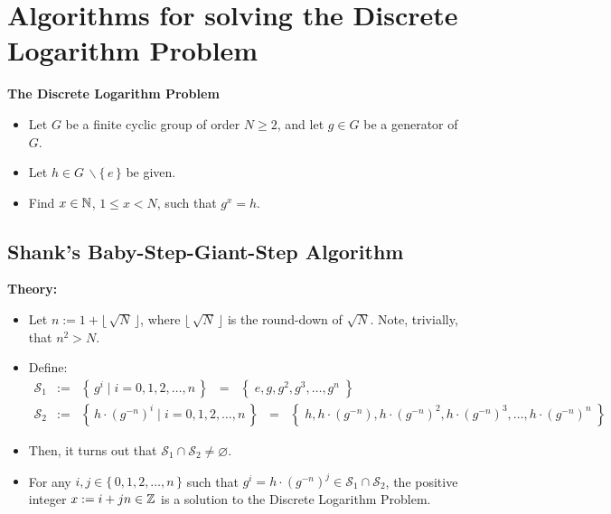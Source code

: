 
\section{Algorithms for solving the Discrete Logarithm Problem}
\setcounter{theorem}{0}
\setcounter{equation}{0}

\vskip 1.0cm
\begin{center}
\begin{minipage}{0.80\textwidth}
	\begin{center}\textbf{The Discrete Logarithm Problem}\end{center}
	\begin{itemize}
	\item	Let $G$ be a finite cyclic group of order $N \geq 2$, and let $g \in G$ be a generator of $G$.
	\item	Let $h \in G\,\backslash \{\,e\,\}$ be given.
	\item	Find $x \in \mathbb{N}$, $1 \leq x < N$, such that $g^{x} = h$.
	\end{itemize}
\end{minipage}
\end{center}
\vskip 1.0cm

\subsection{Shank's Baby-Step-Giant-Step Algorithm}

\noindent
\textbf{Theory:}
\begin{itemize}
\item	Let $n := 1 + \lfloor\,\sqrt{N}\,\rfloor$, where $\lfloor\,\sqrt{N}\,\rfloor$ is the round-down of $\sqrt{N}$.
		Note, trivially, that $n^{2} > N$.
\item	Define:
		\begin{eqnarray*}
		\mathcal{S}_{1} & := & \left\{\,g^{i}\;\vert\;i = 0,1,2,\ldots,n\,\right\}\;\;=\;\;\left\{\;e, g, g^{2}, g^{3}, \ldots, g^{n}\;\right\} \\
		\mathcal{S}_{2} & := & \left\{\,h\cdot(g^{-n})^{i}\;\vert\;i = 0,1,2,\ldots,n\,\right\}\;\;=\;\;\left\{\;h, h\cdot(g^{-n}), h\cdot(g^{-n})^{2}, h\cdot(g^{-n})^{3}, \ldots, h\cdot(g^{-n})^{n}\;\right\}
		\end{eqnarray*}
\item	Then, it turns out that $\mathcal{S}_{1}\cap\mathcal{S}_{2} \neq \varnothing$.
\item	For any $i, j \in \{\,0,1,2,\ldots,n\,\}$ such that $g^{i} = h\cdot(g^{-n})^{j} \in \mathcal{S}_{1}\cap\mathcal{S}_{2}$,
		the positive integer $x := i + jn \in \mathbb{Z}$ is a solution to the Discrete Logarithm Problem.
\end{itemize}

